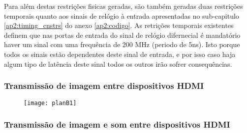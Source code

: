Para além destas restrições fisicas geradas, são também geradas duas restrições temporais quanto aos sinais de relógio à entrada apresentadas no sub-capitulo \ref{ap2:timing_cnstrs} do anexo \ref{ap2:codigo}. As retrições temporais existentes definem que nas portas de entrada do sinal de relógio difernecial é mandatório haver um sinal com uma frequência de 200 MHz (periodo de 5ns). Isto porque todos os sinais estão dependentes deste sinal de entrada, e por isso caso haja algum tipo de latência deste sinal todos os outros irão sofrer consequências.

\subsubsection{Transmissão de imagem entre dispositivos HDMI}

\begin{figure}[h!]
	\begin{center}
		\leavevmode
		\texttt{[image: planB1]}
		\caption{}
		\label{fig:planb1}
	\end{center}
\end{figure}

\subsubsection{Transmissão de imagem e som entre dispositivos HDMI}